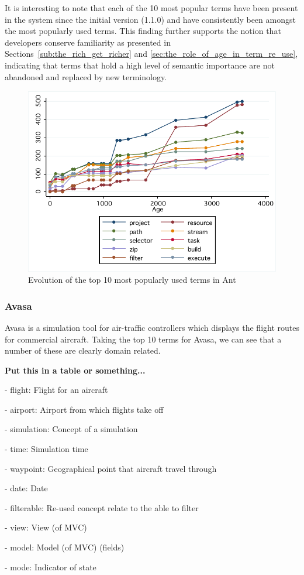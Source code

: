 It is interesting to note that each of the 10 most popular terms have been present in the system since the initial version (1.1.0) and have consistently been amongst the most popularly used terms. This finding further supports the notion that developers conserve familiarity as presented in Sections~\ref{sub:the_rich_get_richer} and \ref{sec:the_role_of_age_in_term_re_use}, indicating that terms that hold a high level of semantic importance are not abandoned and replaced by new terminology.

\begin{figure}[t]
\centering
\includegraphics[width=\textwidth]{Figures/Vocab-AntPopular.pdf}
\caption{Evolution of the top 10 most popularly used terms in Ant}
\label{fig:vocab-popular-terms-ant}
\end{figure}


\subsubsection{Avasa} %
\label{ssub:avasa}

Avasa is a simulation tool for air-traffic controllers which displays the flight routes for commercial aircraft. Taking the top 10 terms for Avasa, we can see that a number of these are clearly domain related.

\crumbs
{
\textbf{Put this in a table or something...}

- flight: Flight for an aircraft

- airport: Airport from which flights take off

- simulation: Concept of a simulation

- time: Simulation time

- waypoint: Geographical point that aircraft travel through

- date: Date

- filterable: Re-used concept relate to the able to filter 

- view: View (of MVC)

- model: Model (of MVC) (fields)

- mode: Indicator of state
}

